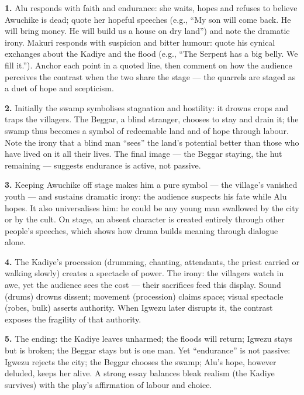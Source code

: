 \documentclass[11pt]{article}
\begin{document}
\begin{corrige}
\textbf{1.} Alu responds with faith and endurance: she waits, hopes and refuses to believe Awuchike is dead; quote her hopeful speeches (e.g., ``My son will come back. He will bring money. He will build us a house on dry land'') and note the dramatic irony. Makuri responds with suspicion and bitter humour: quote his cynical exchanges about the Kadiye and the flood (e.g., ``The Serpent has a big belly. We fill it.''). Anchor each point in a quoted line, then comment on how the audience perceives the contrast when the two share the stage — the quarrels are staged as a duet of hope and scepticism.

\textbf{2.} Initially the swamp symbolises stagnation and hostility: it drowns crops and traps the villagers. The Beggar, a blind stranger, chooses to stay and drain it; the swamp thus becomes a symbol of redeemable land and of hope through labour. Note the irony that a blind man ``sees'' the land's potential better than those who have lived on it all their lives. The final image — the Beggar staying, the hut remaining — suggests endurance is active, not passive.

\textbf{3.} Keeping Awuchike off stage makes him a pure symbol — the village's vanished youth — and sustains dramatic irony: the audience suspects his fate while Alu hopes. It also universalises him: he could be any young man swallowed by the city or by the cult. On stage, an absent character is created entirely through other people's speeches, which shows how drama builds meaning through dialogue alone.

\textbf{4.} The Kadiye's procession (drumming, chanting, attendants, the priest carried or walking slowly) creates a spectacle of power. The irony: the villagers watch in awe, yet the audience sees the cost — their sacrifices feed this display. Sound (drums) drowns dissent; movement (procession) claims space; visual spectacle (robes, bulk) asserts authority. When Igwezu later disrupts it, the contrast exposes the fragility of that authority.

\textbf{5.} The ending: the Kadiye leaves unharmed; the floods will return; Igwezu stays but is broken; the Beggar stays but is one man. Yet ``endurance'' is not passive: Igwezu rejects the city; the Beggar chooses the swamp; Alu's hope, however deluded, keeps her alive. A strong essay balances bleak realism (the Kadiye survives) with the play's affirmation of labour and choice.
\end{corrige}
\end{document}
